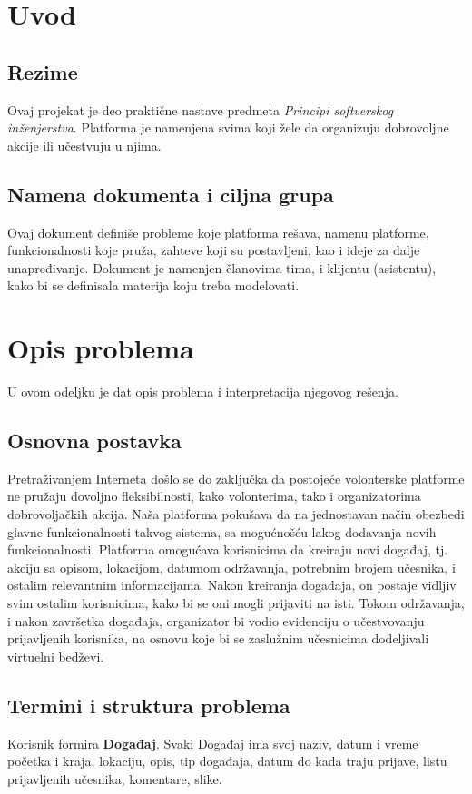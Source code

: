\documentclass[11pt,a4paper]{article}
\begin{document}
\tableofcontents

\newpage

\section{Uvod}
\subsection{Rezime}
Ovaj projekat je deo praktične nastave predmeta \textit{Principi softverskog inženjerstva}. Platforma je namenjena svima koji žele da organizuju dobrovoljne akcije ili učestvuju u njima.
\subsection{Namena dokumenta i ciljna grupa}
Ovaj dokument definiše probleme koje platforma rešava, namenu platforme, funkcionalnosti koje pruža, zahteve koji su postavljeni, kao i ideje za dalje unapređivanje. Dokument je namenjen članovima tima, i klijentu (asistentu), kako bi se definisala materija koju treba modelovati. 

\section{Opis problema}
U ovom odeljku je dat opis problema i interpretacija njegovog rešenja.
\subsection{Osnovna postavka}
Pretraživanjem Interneta došlo se do zaključka da postojeće volonterske platforme ne pružaju dovoljno fleksibilnosti, kako volonterima, tako i organizatorima dobrovoljačkih akcija. Naša platforma pokušava da na jednostavan način obezbedi glavne funkcionalnosti takvog sistema, sa mogućnošću lakog dodavanja novih funkcionalnosti. Platforma omogućava korisnicima da kreiraju novi događaj, tj. akciju sa opisom, lokacijom, datumom održavanja, potrebnim brojem učesnika, i ostalim relevantnim informacijama. Nakon kreiranja događaja, on postaje vidljiv svim ostalim korisnicima, kako bi se oni mogli prijaviti na isti. Tokom održavanja, i nakon završetka događaja, organizator bi vodio evidenciju o učestvovanju prijavljenih korisnika, na osnovu koje bi se zaslužnim učesnicima dodeljivali virtuelni bedževi.
\subsection{Termini i struktura problema}
Korisnik formira \textbf{Događaj}. Svaki Događaj ima svoj naziv, datum i vreme početka i kraja, lokaciju, opis, tip događaja, datum do kada traju prijave, listu prijavljenih učesnika, komentare, slike.
\end{document}
